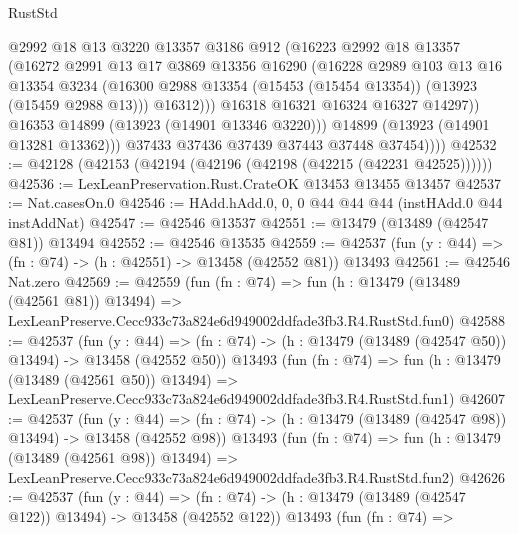 \begin{lexlean}{RustStd}
\begin{coremodule}
                    @2992
                    @18
                    @13
                    @3220
                    @13357
                    @3186
                    @912
                    (@16223
                      @2992
                      @18
                      @13357
                      (@16272
                        @2991
                        @13
                        @17
                        @3869
                        @13356
                        @16290
                        (@16228
                          @2989
                          @103
                          @13
                          @16
                          @13354
                          @3234
                          (@16300 @2988 @13354 (@15453 (@15454 @13354)) (@13923 (@15459 @2988 @13)))
                          @16312)))
                    @16318
                    @16321
                    @16324
                    @16327
                    @14297))
                @16353
                @14899
                (@13923 (@14901 @13346 @3220)))
              @14899
              (@13923 (@14901 @13281 @13362)))
            @37433
            @37436
            @37439
            @37443
            @37448
            @37454))))
@42532 := @42128 (@42153 (@42194 (@42196 (@42198 (@42215 (@42231 @42525))))))
@42536 := LexLeanPreservation.Rust.CrateOK @13453 @13455 @13457
@42537 := Nat.casesOn.{0}
@42546 := HAdd.hAdd.{0, 0, 0} @44 @44 @44 (instHAdd.{0} @44 instAddNat)
@42547 := @42546 @13537
@42551 := @13479 (@13489 (@42547 @81)) @13494
@42552 := @42546 @13535
@42559 := @42537 (fun (y : @44) => (fn : @74) -> (h : @42551) -> @13458 (@42552 @81)) @13493
@42561 := @42546 Nat.zero
@42569 := @42559
    (fun (fn : @74) =>
    fun (h : @13479 (@13489 (@42561 @81)) @13494) =>
    LexLeanPreserve.Cecc933c73a824e6d949002ddfade3fb3.R4.RustStd.fun0)
@42588 := @42537
    (fun (y : @44) =>
    (fn : @74) -> (h : @13479 (@13489 (@42547 @50)) @13494) -> @13458 (@42552 @50))
    @13493
    (fun (fn : @74) =>
    fun (h : @13479 (@13489 (@42561 @50)) @13494) =>
    LexLeanPreserve.Cecc933c73a824e6d949002ddfade3fb3.R4.RustStd.fun1)
@42607 := @42537
    (fun (y : @44) =>
    (fn : @74) -> (h : @13479 (@13489 (@42547 @98)) @13494) -> @13458 (@42552 @98))
    @13493
    (fun (fn : @74) =>
    fun (h : @13479 (@13489 (@42561 @98)) @13494) =>
    LexLeanPreserve.Cecc933c73a824e6d949002ddfade3fb3.R4.RustStd.fun2)
@42626 := @42537
    (fun (y : @44) =>
    (fn : @74) -> (h : @13479 (@13489 (@42547 @122)) @13494) -> @13458 (@42552 @122))
    @13493
    (fun (fn : @74) =>

\end{coremodule}
\end{lexlean}
